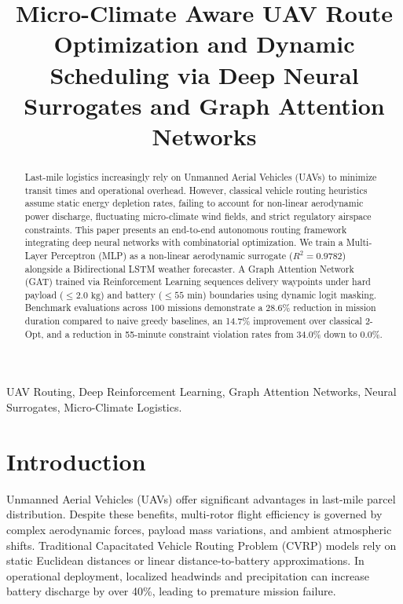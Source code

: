 \documentclass[conference]{IEEEtran}
\begin{document}
\title{Micro-Climate Aware UAV Route Optimization and Dynamic Scheduling via Deep Neural Surrogates and Graph Attention Networks}

\author{
}

\maketitle

\begin{abstract}
Last-mile logistics increasingly rely on Unmanned Aerial Vehicles (UAVs) to minimize transit times and operational overhead. However, classical vehicle routing heuristics assume static energy depletion rates, failing to account for non-linear aerodynamic power discharge, fluctuating micro-climate wind fields, and strict regulatory airspace constraints. This paper presents an end-to-end autonomous routing framework integrating deep neural networks with combinatorial optimization. We train a Multi-Layer Perceptron (MLP) as a non-linear aerodynamic surrogate ($R^2 = 0.9782$) alongside a Bidirectional LSTM weather forecaster. A Graph Attention Network (GAT) trained via Reinforcement Learning sequences delivery waypoints under hard payload ($\le 2.0\text{ kg}$) and battery ($\le 55\text{ min}$) boundaries using dynamic logit masking. Benchmark evaluations across 100 missions demonstrate a 28.6\% reduction in mission duration compared to naive greedy baselines, an 14.7\% improvement over classical 2-Opt, and a reduction in 55-minute constraint violation rates from 34.0\% down to 0.0\%.
\end{abstract}

\begin{IEEEkeywords}
UAV Routing, Deep Reinforcement Learning, Graph Attention Networks, Neural Surrogates, Micro-Climate Logistics.
\end{IEEEkeywords}

\section{Introduction}
Unmanned Aerial Vehicles (UAVs) offer significant advantages in last-mile parcel distribution. Despite these benefits, multi-rotor flight efficiency is governed by complex aerodynamic forces, payload mass variations, and ambient atmospheric shifts. Traditional Capacitated Vehicle Routing Problem (CVRP) models rely on static Euclidean distances or linear distance-to-battery approximations. In operational deployment, localized headwinds and precipitation can increase battery discharge by over 40\%, leading to premature mission failure.
\end{document}
